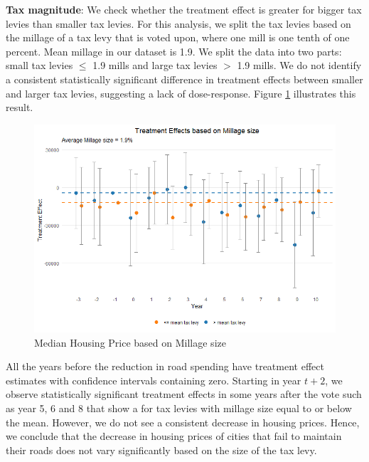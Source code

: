 \vskip 1cm

\textbf{Tax magnitude}: We check whether the treatment effect is greater for bigger tax levies than smaller tax levies. For this analysis, we split the tax levies based on the millage of a tax levy that is voted upon, where one mill is one tenth of one percent. Mean millage in our dataset is 1.9. We split the data into two parts: small tax levies $\le$ 1.9 mills and large tax levies $>$ 1.9 mills. We do not identify a consistent statistically significant difference in treatment effects between smaller and larger tax levies, suggesting a lack of dose-response. Figure \ref{fig:tes_covs_size} illustrates this result.

\begin{figure}[htbp]
    \centering
    \includegraphics[width=\textwidth,keepaspectratio]{images/tes_size_re.png}    
    \caption{Median Housing Price based on Millage size}
    \label{fig:tes_covs_size}
\end{figure}

All the years before the reduction in road spending have treatment effect estimates with confidence intervals containing zero. Starting in year $t+2$, we observe statistically significant treatment effects in some years after the vote such as year 5, 6 and 8 that show a for tax levies with millage size equal to or below the mean. However, we do not see a consistent decrease in housing prices. Hence, we conclude that the decrease in housing prices of cities that fail to maintain their roads does not vary significantly based on the size of the tax levy.

\vskip 1cm

